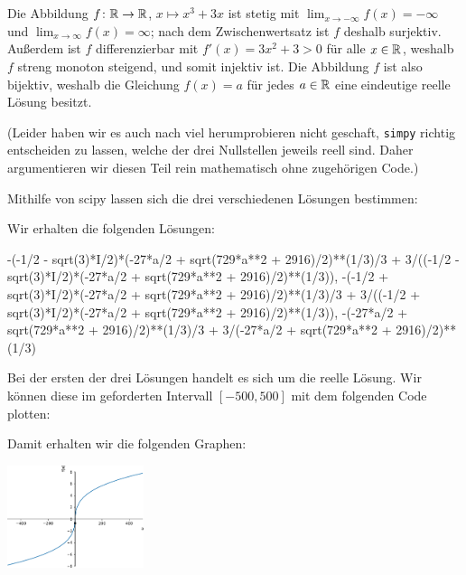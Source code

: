 \section{}

Die Abbildung $f \colon \mathbb{R} \to \mathbb{R}$, $x \mapsto x^3 + 3x$ ist stetig mit $\lim_{x \to -\infty} f(x) = -\infty$ und $\lim_{x \to \infty} f(x) = \infty$;
nach dem Zwischenwertsatz ist $f$ deshalb surjektiv.
Außerdem ist $f$ differenzierbar mit $f'(x) = 3 x^2 + 3 > 0$ für alle $x \in \mathbb{R}$, weshalb $f$ streng monoton steigend, und somit injektiv ist.
Die Abbildung $f$ ist also bijektiv, weshalb die Gleichung $f(x) = a$ für jedes $a \in \mathbb{R}$ eine eindeutige reelle Lösung besitzt.

(Leider haben wir es auch nach viel herumprobieren nicht geschaft, \texttt{simpy} richtig entscheiden zu lassen, welche der drei Nullstellen jeweils reell sind.
Daher argumentieren wir diesen Teil rein mathematisch ohne zugehörigen Code.)

Mithilfe von scipy lassen sich die drei verschiedenen Lösungen bestimmen:



Wir erhalten die folgenden Lösungen:

\begin{consoleoutput}
{-(-1/2 - sqrt(3)*I/2)*(-27*a/2 + sqrt(729*a**2 + 2916)/2)**(1/3)/3 + 3/((-1/2 - sqrt(3)*I/2)*(-27*a/2 + sqrt(729*a**2 + 2916)/2)**(1/3)), -(-1/2 + sqrt(3)*I/2)*(-27*a/2 + sqrt(729*a**2 + 2916)/2)**(1/3)/3 + 3/((-1/2 + sqrt(3)*I/2)*(-27*a/2 + sqrt(729*a**2 + 2916)/2)**(1/3)), -(-27*a/2 + sqrt(729*a**2 + 2916)/2)**(1/3)/3 + 3/(-27*a/2 + sqrt(729*a**2 + 2916)/2)**(1/3)}
\end{consoleoutput}

Bei der ersten der drei Lösungen handelt es sich um die reelle Lösung.
Wir können diese im geforderten Intervall $[-500, 500]$ mit dem folgenden Code plotten:



Damit erhalten wir die folgenden Graphen:

\begin{center}
  \includegraphics[width = 0.3\textwidth]{chapter_05/exercise_05_26_figure.pdf}
\end{center}
